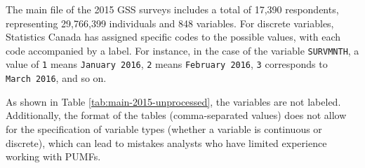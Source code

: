 \documentclass[Royal,times,sageh]{sagej}
\begin{document}
The main file of the 2015 GSS surveys includes a total of 17,390
respondents, representing 29,766,399 individuals and 848 variables. For
discrete variables, Statistics Canada has assigned specific codes to the
possible values, with each code accompanied by a label. For instance, in
the case of the variable \texttt{SURVMNTH}, a value of \texttt{1} means
\texttt{January\ 2016}, \texttt{2} means \texttt{February\ 2016},
\texttt{3} corresponds to \texttt{March\ 2016}, and so on.

As shown in Table \ref{tab:main-2015-unprocessed}, the variables are not
labeled. Additionally, the format of the tables (comma-separated values)
does not allow for the specification of variable types (whether a
variable is continuous or discrete), which can lead to mistakes analysts
who have limited experience working with PUMFs.

\begin{table}
\centering
\caption{\label{tab:gss-main-file-2015}\label{tab:main-2015-unprocessed}Visualization of the first ten lines and first six columns of the Main file of the 2015 GSS.}
\centering
{}
\end{table}
\end{document}

